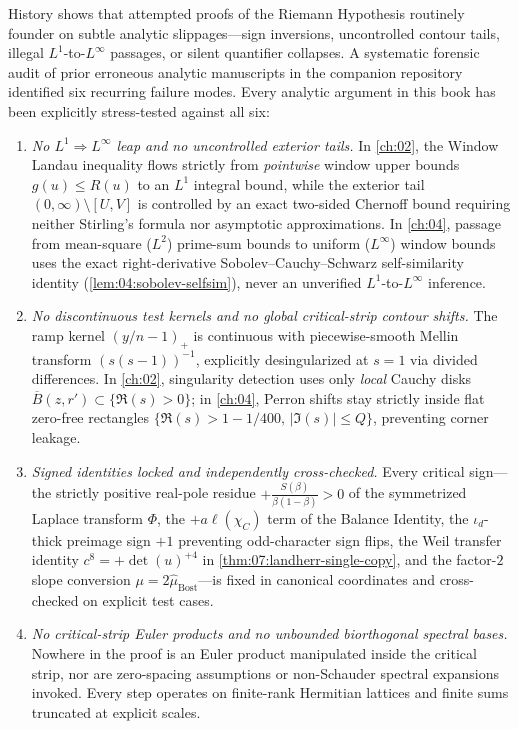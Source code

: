History shows that attempted proofs of the Riemann Hypothesis routinely founder on subtle analytic slippages—sign inversions, uncontrolled contour tails, illegal $L^1$-to-$L^\infty$ passages, or silent quantifier collapses. A systematic forensic audit of prior erroneous analytic manuscripts in the companion repository identified six recurring failure modes. Every analytic argument in this book has been explicitly stress-tested against all six:

\begin{enumerate}[label=\textbf{G\arabic*.}]
\item \emph{No $L^1 \Rightarrow L^\infty$ leap and no uncontrolled exterior tails.}
In \cref{ch:02}, the Window Landau inequality flows strictly from \emph{pointwise} window upper bounds $g(u) \le R(u)$ to an $L^1$ integral bound, while the exterior tail $(0,\infty) \setminus [U,V]$ is controlled by an exact two-sided Chernoff bound requiring neither Stirling's formula nor asymptotic approximations. In \cref{ch:04}, passage from mean-square ($L^2$) prime-sum bounds to uniform ($L^\infty$) window bounds uses the exact right-derivative Sobolev--Cauchy--Schwarz self-similarity identity (\cref{lem:04:sobolev-selfsim}), never an unverified $L^1$-to-$L^\infty$ inference.

\item \emph{No discontinuous test kernels and no global critical-strip contour shifts.}
The ramp kernel $(y/n - 1)_+$ is continuous with piecewise-smooth Mellin transform $(s(s-1))^{-1}$, explicitly desingularized at $s = 1$ via divided differences. In \cref{ch:02}, singularity detection uses only \emph{local} Cauchy disks $\overline{B}(z, r') \subset \{\Re(s) > 0\}$; in \cref{ch:04}, Perron shifts stay strictly inside flat zero-free rectangles $\{\Re(s) > 1 - 1/400,\, |\Im(s)| \le Q\}$, preventing corner leakage.

\item \emph{Signed identities locked and independently cross-checked.}
Every critical sign—the strictly positive real-pole residue $+\frac{S(\beta)}{\beta(1-\beta)} > 0$ of the symmetrized Laplace transform $\Phi$, the $+a\ell(\chi_C)$ term of the Balance Identity, the $\iota_d$-thick preimage sign $+1$ preventing odd-character sign flips, the Weil transfer identity $c^8 = +\det(u)^{+4}$ in \cref{thm:07:landherr-single-copy}, and the factor-$2$ slope conversion $\mu = 2\widehat{\mu}_{\mathrm{Bost}}$—is fixed in canonical coordinates and cross-checked on explicit test cases.

\item \emph{No critical-strip Euler products and no unbounded biorthogonal spectral bases.}
Nowhere in the proof is an Euler product manipulated inside the critical strip, nor are zero-spacing assumptions or non-Schauder spectral expansions invoked. Every step operates on finite-rank Hermitian lattices and finite sums truncated at explicit scales.


\end{enumerate}

